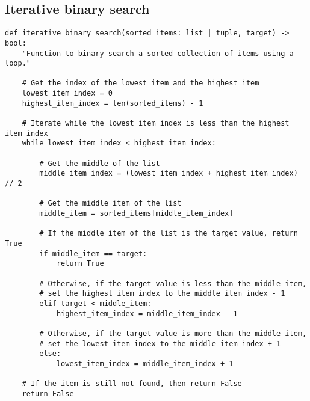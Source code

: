 \documentclass[11pt]{article}
\begin{document}
\subsection{Iterative binary search}
\label{sec:org0c72eb2}
\begin{verbatim}
def iterative_binary_search(sorted_items: list | tuple, target) -> bool:
    "Function to binary search a sorted collection of items using a loop."

    # Get the index of the lowest item and the highest item
    lowest_item_index = 0
    highest_item_index = len(sorted_items) - 1

    # Iterate while the lowest item index is less than the highest item index
    while lowest_item_index < highest_item_index:

        # Get the middle of the list
        middle_item_index = (lowest_item_index + highest_item_index) // 2

        # Get the middle item of the list
        middle_item = sorted_items[middle_item_index]

        # If the middle item of the list is the target value, return True
        if middle_item == target:
            return True

        # Otherwise, if the target value is less than the middle item,
        # set the highest item index to the middle item index - 1
        elif target < middle_item:
            highest_item_index = middle_item_index - 1

        # Otherwise, if the target value is more than the middle item,
        # set the lowest item index to the middle item index + 1
        else:
            lowest_item_index = middle_item_index + 1

    # If the item is still not found, then return False
    return False
\end{verbatim}

 \newpage
\end{document}
